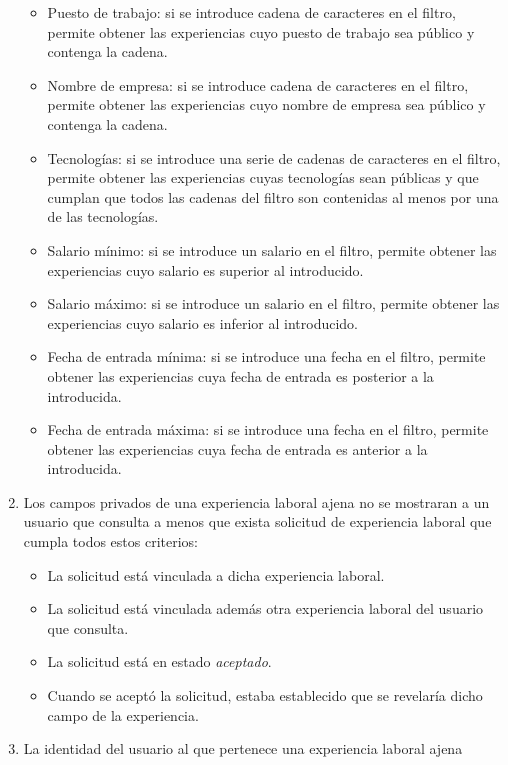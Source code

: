 \documentclass[a4paper, 12pt]{book}
\begin{document}
\begin{enumerate}
        \begin{itemize}
            \item Puesto de trabajo: si se introduce cadena de caracteres en el filtro, permite obtener las experiencias cuyo puesto de trabajo sea público y contenga la cadena.
            \item Nombre de empresa: si se introduce cadena de caracteres en el filtro, permite obtener las experiencias cuyo nombre de empresa sea público y contenga la cadena.
            \item Tecnologías: si se introduce una serie de cadenas de caracteres en el filtro, permite obtener las experiencias cuyas tecnologías sean públicas y que cumplan que todos las cadenas del filtro son contenidas al menos por una de las tecnologías.
            \item Salario mínimo: si se introduce un salario en el filtro, permite obtener las experiencias cuyo salario es superior al introducido.
            \item Salario máximo: si se introduce un salario en el filtro, permite obtener las experiencias cuyo salario es inferior al introducido.
            \item Fecha de entrada mínima: si se introduce una fecha en el filtro, permite obtener las experiencias cuya fecha de entrada es posterior a la introducida.
            \item Fecha de entrada máxima: si se introduce una fecha en el filtro, permite obtener las experiencias cuya fecha de entrada es anterior a la introducida.
        \end{itemize}
        \item Los campos privados de una experiencia laboral ajena no se mostraran a un usuario que consulta a menos que exista solicitud de experiencia laboral que cumpla todos estos criterios:
        \begin{itemize}
            \item La solicitud está vinculada a dicha experiencia laboral.
            \item La solicitud está vinculada además otra experiencia laboral del usuario que consulta.
            \item La solicitud está en estado \emph{aceptado}.
            \item Cuando se aceptó la solicitud, estaba establecido que se revelaría dicho campo de la experiencia.
        \end{itemize}
        \item La identidad del usuario al que pertenece una experiencia laboral ajena

\end{enumerate}
\end{document}
